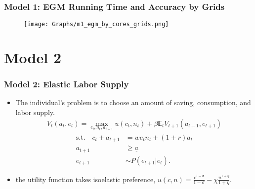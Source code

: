 \documentclass[xcolor=x11names,compress]{beamer}
\renewcommand{\(}{\begin{columns}}
\renewcommand{\)}{\end{columns}}
\newcommand{\<}[1]{\begin{column}{#1}}
\renewcommand{\>}{\end{column}}
\begin{document}
\setcounter{subfigure}{0}
\begin{frame}
\frametitle{Model 1: EGM Running Time and Accuracy by Grids}
\begin{figure}
\begin{center}
\texttt{[image: Graphs/m1\_egm\_by\_cores\_grids.png]}
\end{center}
\end{figure}
\end{frame}



\section{Model 2}
\begin{frame}
\frametitle{Model 2: Elastic Labor Supply}
\begin{itemize}
\item The individual's problem is to choose an amount of saving, consumption, and labor supply.
\begin{align*}
V_t(a_{t},e_t) = \max_{c_t,n_t,a_{t+1}} u(c_{t},n_t) + \beta \mathbb{E}_t V_{t+1}(a_{t+1},e_{t+1})
\end{align*}
\begin{align*}
\text{s.t.} \quad c_t + a_{t+1} 	&= w e_t n_t + (1+r)a_t \\
a_{t+1} 		&\geq \underline{a}\\
e_{t+1} 		&\sim P(e_{t+1}|e_t).
\end{align*}
\item the utility function takes isoelastic preference, $u(c,n) = \frac{c^{1-\sigma}}{1-\sigma} - \chi \frac{n^{1+\eta}}{1+\eta}$.
\end{itemize}
\end{frame}
\end{document}
